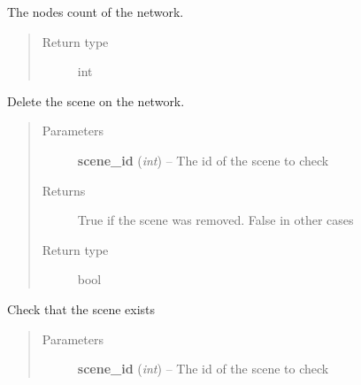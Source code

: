 \documentclass[letterpaper,10pt,english]{sphinxmanual}
\begin{document}
\begin{fulllineitems}
\begin{fulllineitems}
\begin{quote}
\begin{description}
\end{description}\end{quote}

\end{fulllineitems}


\begin{fulllineitems}
\label{network:openzwave.network.ZWaveNetwork.nodes_count}
The nodes count of the network.
\begin{quote}\begin{description}
\item[{Return type}] \leavevmode
int

\end{description}\end{quote}

\end{fulllineitems}


\begin{fulllineitems}
\label{network:openzwave.network.ZWaveNetwork.remove_scene}
Delete the scene on the network.
\begin{quote}\begin{description}
\item[{Parameters}] \leavevmode
\textbf{scene\_id} (\emph{int}) -- The id of the scene to check

\item[{Returns}] \leavevmode
True if the scene was removed. False in other cases

\item[{Return type}] \leavevmode
bool

\end{description}\end{quote}

\end{fulllineitems}


\begin{fulllineitems}
\label{network:openzwave.network.ZWaveNetwork.scene_exists}
Check that the scene exists
\begin{quote}\begin{description}
\item[{Parameters}] \leavevmode
\textbf{scene\_id} (\emph{int}) -- The id of the scene to check


\end{description}
\end{quote}
\end{fulllineitems}
\end{fulllineitems}
\end{document}
